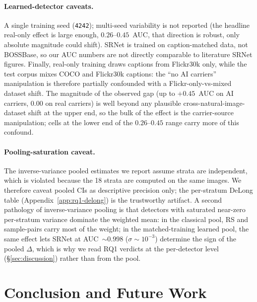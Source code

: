 \documentclass[10pt,twocolumn,a4paper]{article}
\begin{document}
\paragraph{Learned-detector caveats.} A single training seed (\texttt{4242}); multi-seed variability is not reported (the headline real-only effect is large enough, $0.26$--$0.45$~AUC, that direction is robust, only absolute magnitude could shift). SRNet is trained on caption-matched data, not BOSSBase, so our AUC numbers are not directly comparable to literature SRNet figures. Finally, real-only training draws captions from Flickr30k only, while the test corpus mixes COCO and Flickr30k captions: the ``no AI carriers'' manipulation is therefore partially confounded with a Flickr-only-vs-mixed dataset shift. The magnitude of the observed gap (up to $+0.45$~AUC on AI carriers, $0.00$ on real carriers) is well beyond any plausible cross-natural-image-dataset shift at the upper end, so the bulk of the effect is the carrier-source manipulation; cells at the lower end of the $0.26$--$0.45$ range carry more of this confound.

\paragraph{Pooling-saturation caveat.} The inverse-variance pooled estimates we report assume strata are independent, which is violated because the 18 strata are computed on the same images. We therefore caveat pooled CIs as descriptive precision only; the per-stratum DeLong table (Appendix~\ref{app:rq1-delong}) is the trustworthy artifact. A second pathology of inverse-variance pooling is that detectors with saturated near-zero per-stratum variance dominate the weighted mean: in the classical pool, RS and sample-pairs carry most of the weight; in the matched-training learned pool, the same effect lets SRNet at AUC~$\sim 0.998$ ($\sigma\!\sim\!10^{-3}$) determine the sign of the pooled $\Delta$, which is why we read RQ1 verdicts at the per-detector level (\S\ref{sec:discussion}) rather than from the pool.

\section{Conclusion and Future Work}
\label{sec:conclusion}
\end{document}
